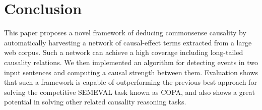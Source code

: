 \section{Conclusion}
\label{sec:conclude} This paper proposes a novel framework of
deducing commonsense causality by automatically harvesting a network
of causal-effect terms extracted from a large web corpus. Such a
network can achieve a high coverage including long-tailed causality
relations. We then implemented an algorithm for detecting events in
two input sentences and computing a causal strength between them.
Evaluation shows that such a framework is capable of outperforming
the previous best approach for solving the competitive SEMEVAL task
known as COPA, and also shows a great potential in solving other
related causality reasoning tasks.
